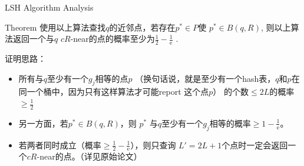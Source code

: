 \begin{frame}{LSH Algorithm Analysis}
    \begin{block}{Theorem}
        使用以上算法查找$q$的近邻点，若存在$p^{*} \in P$使 $p^{*} \in B(q, R)$, 则以上算法返回一个与$q$ $cR$-near的点的概率至少为$\frac{1}{2} - \frac{1}{\mathrm e }$   .
    \end{block}
    证明思路：
    \begin{itemize}
        \item 所有与$q$至少有一个$g_j$相等的点$p$ （换句话说，就是至少有一个hash表，$q$和$p$在同一个桶中，因为只有这样算法才可能report 这个点$p$） 的个数$\leqslant 2L$的概率$\geqslant \frac{1}{2}$
        \item 另一方面，若$p^{*} \in B(q, R)$，则 $p^{*}$ 与$q$至少有一个$g_j$相等的概率$\geqslant 1 - \frac{1}{\mathrm e}$。
        \item 若两者同时成立（概率$\geqslant \frac{1}{2}  - \frac{1}{\mathrm e}$），则只查询 $L' = 2L+1$个点时一定会返回一个$cR$-near的点。（详见原始论文）
    \end{itemize}
\end{frame}